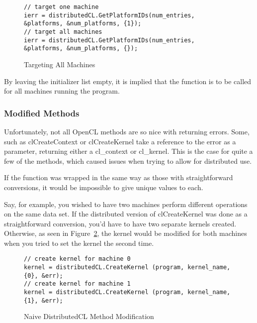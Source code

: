 \documentclass[../thesis.tex]{subfiles}
\begin{document}
    \begin{figure}[htbp]
        \centering
        \lstset{language=cpp}
            \begin{lstlisting}[tabsize=2]
// target one machine
ierr = distributedCL.GetPlatformIDs(num_entries, &platforms, &num_platforms, {1});
// target all machines
ierr = distributedCL.GetPlatformIDs(num_entries, &platforms, &num_platforms, {});
            \end{lstlisting}
        \caption{Targeting All Machines}
        \label{fig:universal_target}
    \end{figure}

    By leaving the initializer list empty, it is implied that the function is to be called for all machines running the program.
    \subsubsection{Modified Methods} %
    \label{ssub:modified_methods}
        Unfortunately, not all OpenCL methods are so nice with returning errors. Some, such as clCreateContext or clCreateKernel take a reference to the error as a parameter, returning either a cl\_context or cl\_kernel. This is the case for quite a few of the methods, which caused issues when trying to allow for distributed use.

        If the function was wrapped in the same way as those with straightforward conversions, it would be impossible to give unique values to each.

        Say, for example, you wished to have two machines perform different operations on the same data set. If the distributed version of clCreateKernel was done as a straightforward conversion, you'd have to have two separate kernels created. Otherwise, as seen in Figure~\ref{fig:kernel_clash}, the kernel would be modified for both machines when you tried to set the kernel the second time.

        \begin{figure}[htbp]
            \centering
                \lstset{language=cpp}
                \begin{lstlisting}[tabsize=2]
// create kernel for machine 0
kernel = distributedCL.CreateKernel (program, kernel_name, {0}, &err);
// create kernel for machine 1
kernel = distributedCL.CreateKernel (program, kernel_name, {1}, &err);
                \end{lstlisting}
            \caption{Naive DistributedCL Method Modification}
            \label{fig:kernel_clash}
        \end{figure}
\end{document}
